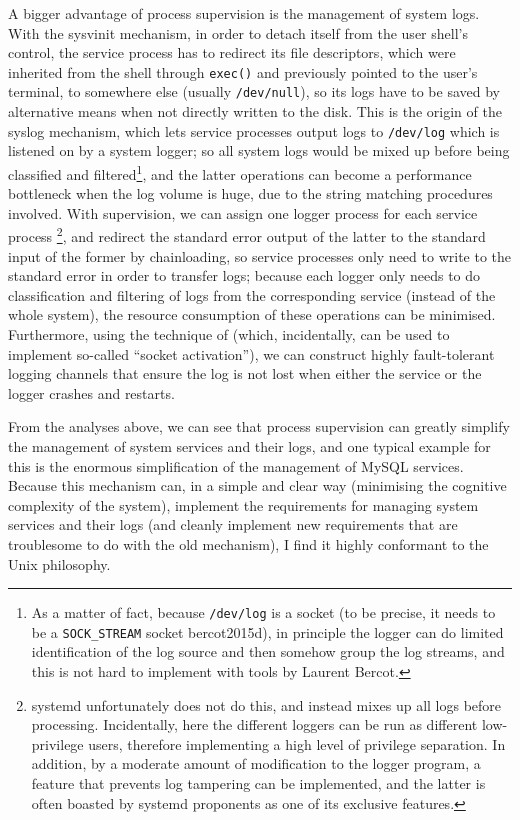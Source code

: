 A bigger advantage of process supervision is the management of system logs.
With the sysvinit mechanism, in order to detach itself from the user shell's
control, the service process has to redirect its file descriptors, which were
inherited from the shell through \verb|exec()| and previously pointed to the
user's terminal, to somewhere else (usually \verb|/dev/null|), so its logs
have to be saved by alternative means when not directly written to the disk.
This is the origin of the syslog mechanism, which lets service processes
output logs to \verb|/dev/log| which is listened on by a system logger; so all
system logs would be mixed up before being classified and filtered\footnote%
{\label{fn:logtype}As a matter of fact, because \texttt{/dev/log} is a socket
(to be precise, it needs to be a \texttt{SOCK\_STREAM} socket\cupercite%
{bercot2015d}), in principle the logger can do limited identification of the
log source and then somehow group the log streams, and this is not hard to
implement with tools by Laurent Bercot.},
and the latter operations can become a performance bottleneck when the log
volume is huge, due to the string matching procedures involved.  With
supervision, we can assign one logger process for each service process%
\footnote{systemd unfortunately does not do this, and
instead mixes up all logs before processing.  Incidentally, here the different
loggers can be run as different low-privilege users, therefore implementing
a high level of privilege separation.  In addition, by a moderate amount of
modification to the logger program, a feature that prevents log tampering%
 can be implemented, and the latter is often boasted by
systemd proponents as one of its exclusive features.}, and redirect the standard
error output of the latter to the standard input of the former by chainloading,
so service processes only need to write to the standard error in order to
transfer logs; because each logger only needs to do classification and filtering
of logs from the corresponding service (instead of the whole system), the
resource consumption of these operations can be minimised.  Furthermore, using
the technique of  (which, incidentally,
can be used to implement so-called ``socket activation''), we can construct
highly fault-tolerant logging channels that ensure the log is not lost
when either the service or the logger crashes and restarts.

From the analyses above, we can see that process supervision can greatly
simplify the management of system services and their logs, and one typical
example for this is the enormous simplification of the management of MySQL
services.  Because this mechanism can, in a simple
and clear way (minimising the cognitive complexity of the system), implement
the requirements for managing system services and their logs (and cleanly
implement new requirements that are troublesome to do with the old
mechanism), I find it highly conformant to the Unix philosophy.

